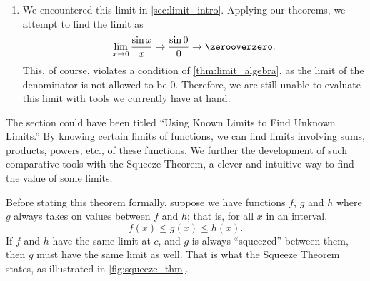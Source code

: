 \begin{example}
\begin{enumerate}
	\item	We encountered this limit in \autoref{sec:limit_intro}. Applying our theorems, we attempt to find the limit as
	\[\lim_{x\to 0}\frac{\sin x}{x}\to\frac{\sin 0}{0} \to\zerooverzero.\]
	This, of course, violates a condition of \autoref{thm:limit_algebra}, as the limit of the denominator is not allowed to be 0. Therefore, we are still unable to evaluate this limit with tools we currently have at hand.
\end{enumerate}
\end{example}

The section could have been titled ``Using Known Limits to Find Unknown Limits.'' By knowing certain limits of functions, we can find limits involving sums, products, powers, etc., of these functions. We further the development of such comparative tools with the Squeeze Theorem, a clever and intuitive way to find the value of some limits.

Before stating this theorem formally, suppose we have functions $f$, $g$ and $h$ where $g$ always takes on values between $f$ and $h$; that is, for all $x$ in an interval,
\[f(x) \leq g(x) \leq h(x).\]
If $f$ and $h$ have the same limit at $c$, and $g$  is always ``squeezed'' between them, then $g$ must have the same limit as well. That is what the Squeeze Theorem states, as illustrated in \autoref{fig:squeeze_thm}.


